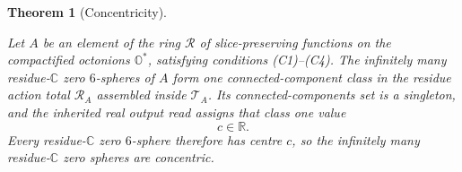 \documentclass[11pt]{article}
\newcommand{\OO}{\mathbb{O}}
\newcommand{\CC}{\mathbb{C}}
\newcommand{\RR}{\mathbb{R}}
\providecommand{\lean}[1]{}
\providecommand{\notready}{}
\providecommand{\uses}[1]{}
\theoremstyle{plain}
\newtheorem{theorem}{Theorem}[section]
\theoremstyle{definition}
\theoremstyle{remark}
\begin{document}
\begin{theorem}[Concentricity]\label{thm:concentricity}
\lean{ASection.concentricity, ASection.residueTotalObject,
ASection.residueTotalTransportRead_certified, ASection.transportLevel}
\notready
\uses{def:A-section, def:base, def:residue-subdiagram, lem:iota-full-faithful,
lem:c-residue-transitive,
lem:residue-spheres, cor:direct-connected-readout,
thm:G2-S6, thm:winding-lift, prop:winding-signature, thm:identity}
Let $A$ be an element of the ring $\mathcal R$ of slice-preserving
functions on the compactified octonions $\OO^{*}$, satisfying conditions
\textup{(C1)--(C4)}. The infinitely many residue-$\CC$ zero $6$-spheres of
$A$ form one connected-component class in the residue action total
$\mathcal R_A$ assembled inside $\mathcal T_A$. Its connected-components set is a
singleton, and the inherited real output read assigns that class one value
\[
  c\in\RR.
\]
Every residue-$\CC$ zero $6$-sphere therefore has centre $c$, so the
infinitely many residue-$\CC$ zero spheres are concentric.
\end{theorem}
\end{document}
